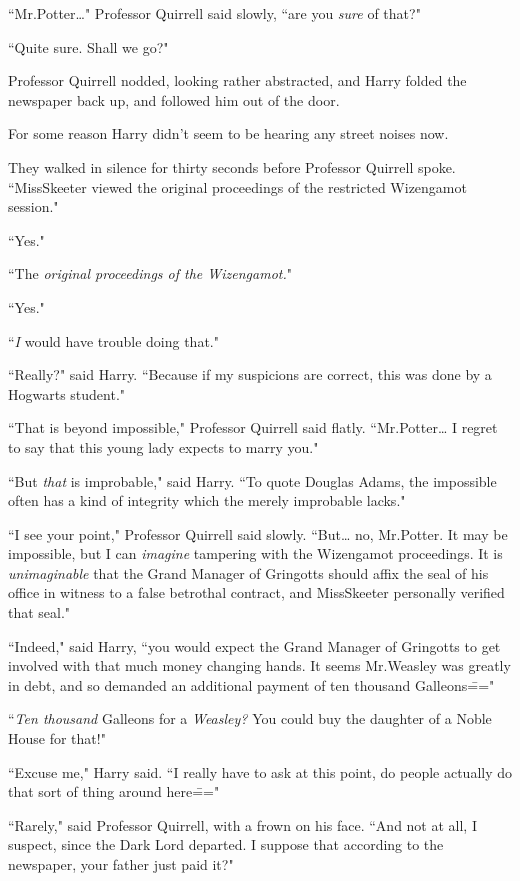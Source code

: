 ``Mr.\?Potter{\ldots}" Professor Quirrell said slowly, ``are you \emph{sure} of that?"

``Quite sure. Shall we go?"

Professor Quirrell nodded, looking rather abstracted, and Harry folded the newspaper back up, and followed him out of the door.

For some reason Harry didn't seem to be hearing any street noises now.

They walked in silence for thirty seconds before Professor Quirrell spoke. ``Miss\?Skeeter viewed the original proceedings of the restricted Wizengamot session."

``Yes."

``The \emph{original proceedings of the Wizengamot.}"

``Yes."

``\emph{I} would have trouble doing that."

``Really?" said Harry. ``Because if my suspicions are correct, this was done by a Hogwarts student."

``That is beyond impossible," Professor Quirrell said flatly. ``Mr.\?Potter{\ldots} I regret to say that this young lady expects to marry you."

``But \emph{that} is improbable," said Harry. ``To quote Douglas Adams, the impossible often has a kind of integrity which the merely improbable lacks."

``I see your point," Professor Quirrell said slowly. ``But{\ldots} no, Mr.\?Potter. It may be impossible, but I can \emph{imagine} tampering with the Wizengamot proceedings. It is \emph{unimaginable} that the Grand Manager of Gringotts should affix the seal of his office in witness to a false betrothal contract, and Miss\?Skeeter personally verified that seal."

``Indeed," said Harry, ``you would expect the Grand Manager of Gringotts to get involved with that much money changing hands. It seems Mr.\?Weasley was greatly in debt, and so demanded an additional payment of ten thousand Galleons\==="

``\emph{Ten thousand} Galleons for a \emph{Weasley?} You could buy the daughter of a Noble House for that!"

``Excuse me," Harry said. ``I really have to ask at this point, do people actually do that sort of thing around here\==="

``Rarely," said Professor Quirrell, with a frown on his face. ``And not at all, I suspect, since the Dark Lord departed. I suppose that according to the newspaper, your father just paid it?"

